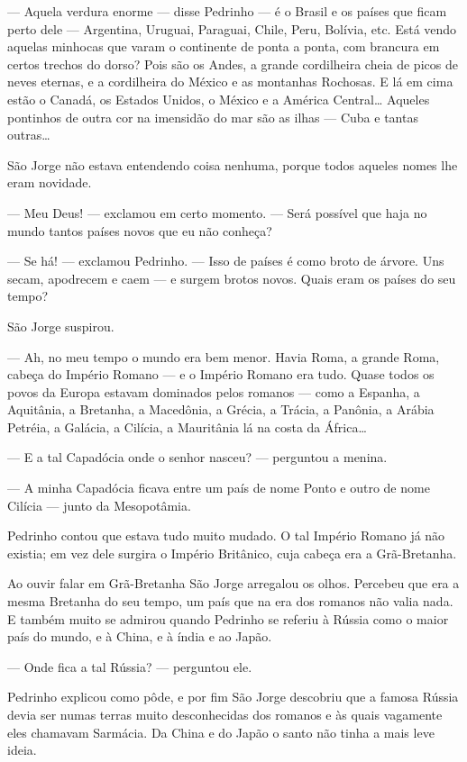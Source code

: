 --- Aquela verdura enorme --- disse Pedrinho --- é o Brasil e os países
que ficam perto dele --- Argentina, Uruguai, Paraguai, Chile, Peru,
Bolívia, etc. Está vendo aquelas minhocas que varam o continente de
ponta a ponta, com brancura em certos trechos do dorso? Pois são os
Andes, a grande cordilheira cheia de picos de neves eternas, e a
cordilheira do México e as montanhas Rochosas. E lá em cima estão o
Canadá, os Estados Unidos, o México e a América Central\ldots{} Aqueles
pontinhos de outra cor na imensidão do mar são as ilhas --- Cuba e
tantas outras\ldots{}

São Jorge não estava entendendo coisa nenhuma, porque todos aqueles
nomes lhe eram novidade.

--- Meu Deus! --- exclamou em certo momento. --- Será possível que haja
no mundo tantos países novos que eu não conheça?

--- Se há! --- exclamou Pedrinho. --- Isso de países é como broto de
árvore. Uns secam, apodrecem e caem --- e surgem brotos novos. Quais
eram os países do seu tempo?

São Jorge suspirou.

--- Ah, no meu tempo o mundo era bem menor. Havia Roma, a grande Roma,
cabeça do Império Romano --- e o Império Romano era tudo. Quase todos os
povos da Europa estavam dominados pelos romanos --- como a Espanha, a
Aquitânia, a Bretanha, a Macedônia, a Grécia, a Trácia, a Panônia, a
Arábia Petréia, a Galácia, a Cilícia, a Mauritânia lá na costa da
África\ldots{}

--- E a tal Capadócia onde o senhor nasceu? --- perguntou a menina.

--- A minha Capadócia ficava entre um país de nome Ponto e outro de nome
Cilícia --- junto da Mesopotâmia.

Pedrinho contou que estava tudo muito mudado. O tal Império Romano já
não existia; em vez dele surgira o Império Britânico, cuja cabeça era a
Grã-Bretanha.

Ao ouvir falar em Grã-Bretanha São Jorge arregalou os olhos. Percebeu
que era a mesma Bretanha do seu tempo, um país que na era dos romanos
não valia nada. E também muito se admirou quando Pedrinho se referiu à
Rússia como o maior país do mundo, e à China, e à índia e ao Japão.

--- Onde fica a tal Rússia? --- perguntou ele.

Pedrinho explicou como pôde, e por fim São Jorge descobriu que a famosa
Rússia devia ser numas terras muito desconhecidas dos romanos e às quais
vagamente eles chamavam Sarmácia. Da China e do Japão o santo não tinha
a mais leve ideia.

